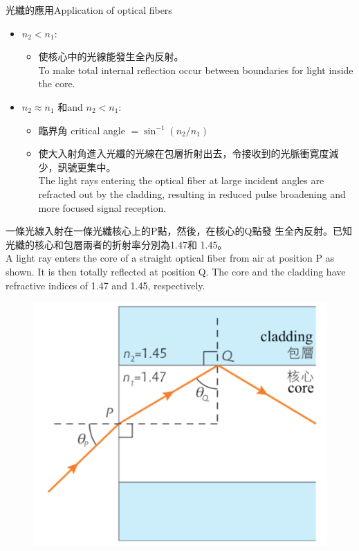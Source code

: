 \documentclass[beamer=true]{standalone}
\begin{document}
\begin{frame}{光纖的應用Application of optical fibers}
\begin{itemize}
    \item $n_2<n_1$:
    \begin{itemize}
        \item 使核心中的光線能發生全內反射。\\To make total internal reflection occur between boundaries for light inside the core.
    \end{itemize}
    \item $n_2\approx n_1$ 和and $n_2<n_1$:
    \begin{itemize}
        \item 臨界角 critical angle $=\sin^{-1}\left(n_2/n_1\right)$
        \item 使大入射角進入光纖的光線在包層折射出去，令接收到的光脈衝寛度減少，訊號更集中。\\The light rays entering the optical fiber at large incident angles are refracted out by the cladding, resulting in reduced pulse broadening and more focused signal reception.
    \end{itemize}
\end{itemize}
\end{frame}

\begin{eg}
    一條光線入射在一條光纖核心上的P點，然後，在核心的Q點發 生全內反射。已知光纖的核心和包層兩者的折射率分別為1.47和 1.45。\\A light ray enters the core of a straight optical fiber from air at position P as shown. It is then totally reflected at position Q. The core and the cladding have refractive indices of 1.47 and 1.45, respectively.
    \begin{figure}
    \centering
    \includegraphics[width=0.5\linewidth]{assets/djnu349bd9843fge.png}
\end{figure}
\end{eg}
\end{document}
